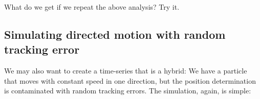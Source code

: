 What do we get if we repeat the above analysis? Try it.

\subsection{Simulating directed motion with random tracking error}
We may also want to create a time-series that is a hybrid:  We have a particle that moves with constant speed in one direction, but the position determination is contaminated with random tracking errors.
The simulation, again, is simple: